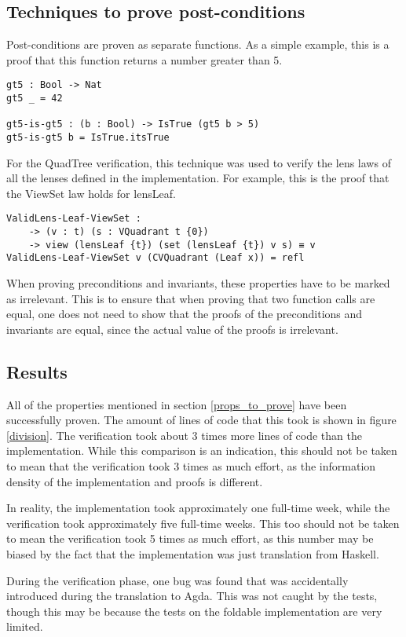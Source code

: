 \subsection{Techniques to prove post-conditions}
Post-conditions are proven as separate functions. As a simple example, this is a proof that this function returns a number greater than 5.
\begin{verbatim}
gt5 : Bool -> Nat
gt5 _ = 42

gt5-is-gt5 : (b : Bool) -> IsTrue (gt5 b > 5)
gt5-is-gt5 b = IsTrue.itsTrue
\end{verbatim}

For the QuadTree verification, this technique was used to verify the lens laws of all the lenses defined in the implementation. For example, this is the proof that the ViewSet law holds for lensLeaf.
\begin{verbatim}
ValidLens-Leaf-ViewSet : 
    -> (v : t) (s : VQuadrant t {0}) 
    -> view (lensLeaf {t}) (set (lensLeaf {t}) v s) ≡ v
ValidLens-Leaf-ViewSet v (CVQuadrant (Leaf x)) = refl
\end{verbatim}

When proving preconditions and invariants, these properties have to be marked as irrelevant. This is to ensure that when proving that two function calls are equal, one does not need to show that the proofs of the preconditions and invariants are equal, since the actual value of the proofs is irrelevant.

\subsection{Results}
All of the properties mentioned in section \ref{props_to_prove} have been successfully proven. The amount of lines of code that this took is shown in figure \ref{division}. The verification took about 3 times more lines of code than the implementation. While this comparison is an indication, this should not be taken to mean that the verification took 3 times as much effort, as the information density of the implementation and proofs is different.

In reality, the implementation took approximately one full-time week, while the verification took approximately five full-time weeks. This too should not be taken to mean the verification took 5 times as much effort, as this number may be biased by the fact that the implementation was just translation from Haskell.

During the verification phase, one bug was found that was accidentally introduced during the translation to Agda. This was not caught by the tests, though this may be because the tests on the foldable implementation are very limited.


